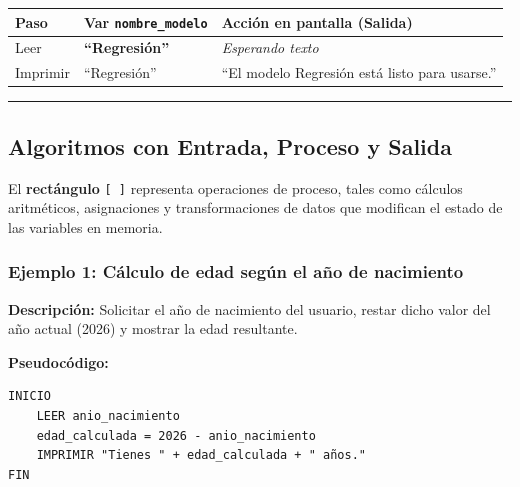 {\def\LTcaptype{none} %
\begin{longtable}[]{@{}
  >{\centering\arraybackslash}p{}
  >{\centering\arraybackslash}p{}
  >{\raggedright\arraybackslash}p{}@{}}
\toprule\noalign{}
\begin{minipage}[b]{\linewidth}\centering
Paso
\end{minipage} & \begin{minipage}[b]{\linewidth}\centering
Var \texttt{nombre\_modelo}
\end{minipage} & \begin{minipage}[b]{\linewidth}\raggedright
Acción en pantalla (Salida)
\end{minipage} \\
\midrule\noalign{}
\endhead
\bottomrule\noalign{}
\endlastfoot
Leer & \textbf{``Regresión''} & \emph{Esperando texto} \\
Imprimir & ``Regresión'' & ``El modelo Regresión está listo para
usarse.'' \\
\end{longtable}
}

\begin{center}\rule{0.5\linewidth}{0.5pt}\end{center}

\subsection{Algoritmos con Entrada, Proceso y
Salida}\label{algoritmos-con-entrada-proceso-y-salida}

El \textbf{rectángulo} \texttt{{[}\ {]}} representa operaciones de
proceso, tales como cálculos aritméticos, asignaciones y
transformaciones de datos que modifican el estado de las variables en
memoria.

\subsubsection{Ejemplo 1: Cálculo de edad según el año de
nacimiento}\label{ejemplo-1-cuxe1lculo-de-edad-seguxfan-el-auxf1o-de-nacimiento}

\textbf{Descripción:} Solicitar el año de nacimiento del usuario, restar
dicho valor del año actual (2026) y mostrar la edad resultante.

\textbf{Pseudocódigo:}

\begin{verbatim}
INICIO
    LEER anio_nacimiento
    edad_calculada = 2026 - anio_nacimiento
    IMPRIMIR "Tienes " + edad_calculada + " años."
FIN
\end{verbatim}

